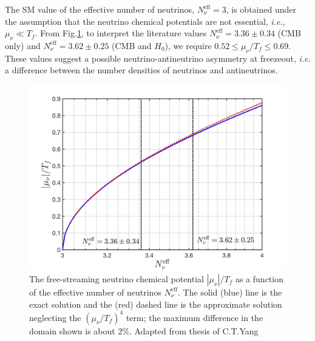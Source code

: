 The SM value of the effective number of neutrinos, $N_\nu^{\mathrm{eff}}=3$, is obtained under the assumption that the neutrino chemical potentials are not essential, {\it i.e.\/}, $\mu_\nu\ll T_f$. From Fig.\;\ref{Chemical_Potential_Neff}, to interpret the literature values $N_\nu^{\mathrm{eff}}=3.36\pm0.34$ (CMB only) and $N_\nu^{\mathrm{eff}}= 3.62\pm0.25$ (CMB and $H_0$), we require $0.52\leqslant\mu_\nu/T_f\leqslant0.69$. These values suggest  a possible neutrino-antineutrino asymmetry at freezeout, {\it i.e.\/} a difference between the number densities of neutrinos and antineutrinos.

\begin{figure}[t]
\begin{center}
\includegraphics[width=\textwidth]{./plots/Chemical_Potential_Neff}
\caption{The free-streaming neutrino chemical potential $|\mu_\nu|/T_f$ as a function of the effective number of neutrinos $N_\nu^{\mathrm{eff}}$. The solid (blue) line is the exact solution and the (red) dashed line is the approximate solution neglecting the $(\mu_\nu/T_f)^4$ term; the maximum difference in the domain shown is about $2\%$. Adapted from  thesis of C.T.Yang \cite{Yang:2024ret}}
\label{Chemical_Potential_Neff}
\end{center}
\end{figure}



